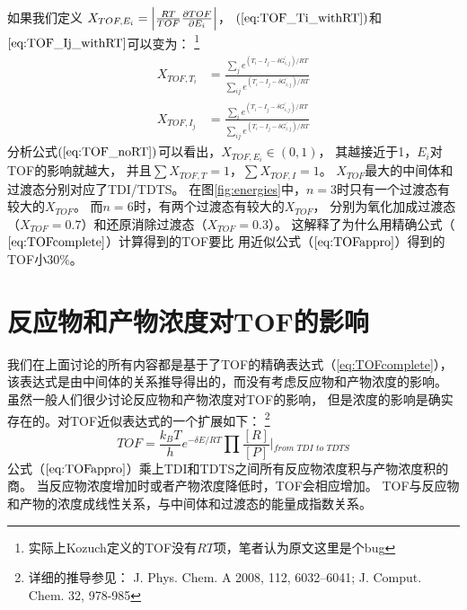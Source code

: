 \documentclass[a4paper,titlepage]{article}
\newcommand{\bigabs}[1]{\Bigl \lvert #1 \Bigr \rvert}
\begin{document}
如果我们定义
$
  X_{TOF,E_i} =
  \bigabs{
  \frac{RT}{TOF}\frac{\partial{TOF}}{\partial{E_i}}
  }
$，
$(\ref{eq:TOF_Ti_withRT})$和$\ref{eq:TOF_Ij_withRT}$可以变为：
\footnote{实际上Kozuch定义的TOF没有$RT$项，笔者认为原文这里是个bug}
\begin{equation}\label{eq:TOF_noRT}
  \begin{split}
    X_{TOF,T_i}
    &= \frac
      {\sum\limits_{j}e^{(T_i-I_j-\delta{G}_{i,j}^{'})/RT}}
      {\sum\limits_{ij}e^{(T_i-I_j-\delta{G}_{i,j}^{'})/RT}} \\
    X_{TOF,I_j}
    &= \frac
      {\sum\limits_{i}e^{(T_i-I_j-\delta{G}_{i,j}^{'})/RT}}
      {\sum\limits_{ij}e^{(T_i-I_j-\delta{G}_{i,j}^{'})/RT}}
  \end{split}
\end{equation}
分析公式$(\ref{eq:TOF_noRT})$可以看出，$X_{TOF,E_i}\in (0, 1)$，
其越接近于1，$E_i$对TOF的影响就越大，
并且$\sum{}X_{TOF,T}=1$，$\sum{}X_{TOF,I}=1$。
$X_{TOF}$最大的中间体和过渡态分别对应了TDI/TDTS。
在图\ref{fig:energies}中，$n=3$时只有一个过渡态有较大的$X_{TOF}$。
而$n=6$时，有两个过渡态有较大的$X_{TOF}$，
分别为氧化加成过渡态（$X_{TOF}=0.7$）和还原消除过渡态（$X_{TOF}=0.3$）。
这解释了为什么用精确公式（$\ref{eq:TOFcomplete}$）计算得到的TOF要比
用近似公式（$\ref{eq:TOFappro}$）得到的TOF小$30\%$。

\section*{反应物和产物浓度对TOF的影响}
我们在上面讨论的所有内容都是基于了TOF的精确表达式（\ref{eq:TOFcomplete}），
该表达式是由中间体的关系推导得出的，而没有考虑反应物和产物浓度的影响。
虽然一般人们很少讨论反应物和产物浓度对TOF的影响，
但是浓度的影响是确实存在的。对TOF近似表达式的一个扩展如下：
\footnote{详细的推导参见：
J. Phys. Chem. A 2008, 112,
6032–6041; J. Comput. Chem. 32, 978-985}
\begin{equation}\label{eq:TOF_withConcentration}
  TOF = \frac{k_BT}{h}e^{-\delta{E}/RT}\prod{}\frac{[R]}{[P]}
        \Biggr\rvert{}_{\textit{from TDI to TDTS}}
\end{equation}
公式（$\ref{eq:TOFappro}$）乘上TDI和TDTS之间所有反应物浓度积与产物浓度积的商。
当反应物浓度增加时或者产物浓度降低时，TOF会相应增加。
TOF与反应物和产物的浓度成线性关系，与中间体和过渡态的能量成指数关系。
\end{document}

